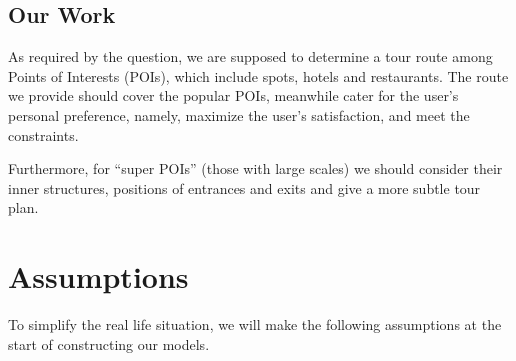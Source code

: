 \documentclass{mcmthesis}
\begin{document}
\subsection{Our Work}
  As required by the question, we are supposed to determine a tour route among Points of Interests (POIs), which include spots, hotels and restaurants. The route we provide should cover the popular POIs, meanwhile cater for the user's personal preference, namely, maximize the user's satisfaction\cite{Cicerali2017Linking}, and meet the constraints. \par
  Furthermore, for ``super POIs'' (those with large scales) we should consider their inner structures, positions of entrances and exits and give a more subtle tour plan.

  

\section{Assumptions}\label{section:assumption}
  To simplify the real life situation, we will make the following assumptions at the start of constructing our models.
\end{document}
